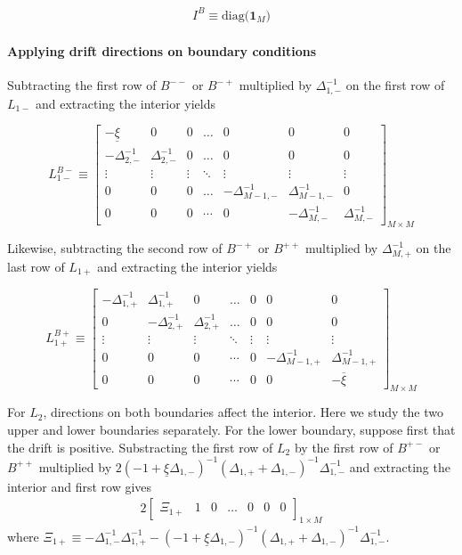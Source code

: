 \documentclass[11pt]{article}
\theoremstyle{definition}
\begin{document}
\begin{align}
I^B \equiv  \text{diag($\mathbf{1}_M$)}
\end{align}


\paragraph{Applying drift directions on boundary conditions}
Subtracting the first row of $B^{--}$ or $B^{-+}$ multiplied by $\Delta_{1,-}^{-1}$ on the first row of $L_{1-}$ and extracting the interior yields

\begin{equation}
L_{1-}^{B-} \equiv \begin{bmatrix}
-\underline{\xi} &0&0&\dots&0&0&0\\
-\Delta_{2,-}^{-1}&\Delta_{2,-}^{-1}&0&\dots&0&0&0\\
\vdots&\vdots&\vdots&\ddots&\vdots&\vdots&\vdots\\
0&0&0&\dots&-\Delta_{M-1,-}^{-1}&\Delta_{M-1,-}^{-1}&0\\
0&0&0&\cdots&0&-\Delta_{M,-}^{-1}&\Delta_{M,-}^{-1}
\end{bmatrix}_{M\times M}
\end{equation}

Likewise, subtracting the second row of $B^{-+}$ or $B^{++}$ multiplied by $\Delta_{M,+}^{-1}$ on the last row of $L_{1+}$ and extracting the interior yields

\begin{equation}
L_{1+}^{B+} \equiv \begin{bmatrix}
-\Delta_{1,+}^{-1}&\Delta_{1,+}^{-1}&0&\dots&0&0&0\\
0&-\Delta_{2,+}^{-1}&\Delta_{2,+}^{-1}&\dots&0&0&0\\
\vdots&\vdots&\vdots&\ddots&\vdots&\vdots&\vdots\\
0&0&0&\cdots&0&-\Delta_{M-1,+}^{-1}&\Delta_{M-1,+}^{-1}\\
0&0&0&\cdots&0&0&-\overline{\xi} 
\end{bmatrix}_{M\times M} \label{eq:L-1p-irregular-right}
\end{equation}

For $L_2$, directions on both boundaries affect the interior. Here we study the two upper and lower boundaries separately. For the lower boundary, suppose first that the drift is positive. Substracting the first row of $L_2$ by the first row of $B^{+-}$ or $B^{++}$ multiplied by $2(-1 + \underline{\xi} \Delta_{1,-} )^{-1} (\Delta_{1,+} + \Delta_{1,-})^{-1}  \Delta_{1,-}^{-1} $  and extracting the interior and first row gives
\begin{align}
2\begin{bmatrix}
\Xi_{1+} &1&0&\dots&0&0&0
\end{bmatrix}_{1\times M}
\end{align}
where $\Xi_{1+} \equiv -\Delta_{1,-}^{-1} \Delta_{1,+}^{-1}  - (-1 + \underline{\xi} \Delta_{1,-})^{-1} (\Delta_{1,+} + \Delta_{1,-})^{-1}  \Delta_{1,-}^{-1}$.
\end{document}

